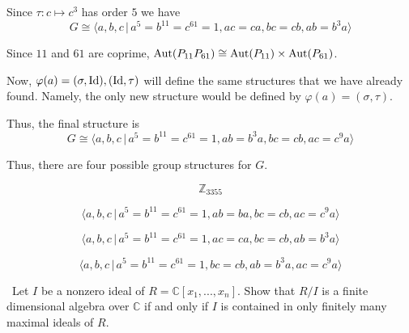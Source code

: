 \documentclass[12pt]{AlgebraQual}
\begin{document}
\begin{solution}
Since $\tau:c\mapsto c^3$ has order $5$ we have $$G\cong\langle a,b,c\,|\, a^5=b^{11}=c^{61}=1,ac=ca,bc=cb,ab=b^3a\rangle$$

 Since $11$ and $61$ are coprime, $\text{Aut}(P_{11}P_{61})\cong\text{Aut}(P_{11})\times\text{Aut}(P_{61})$.

Now, $\varphi(a)=(\sigma,\text{Id}),(\text{Id},\tau)$ will define the same structures that we have already found. Namely, the only new structure would be defined by $\varphi(a)=(\sigma,\tau)$.

Thus, the final structure is $$G\cong\langle a,b,c\,|\, a^5=b^{11}=c^{61}=1,ab=b^3a,bc=cb,ac=c^9a\rangle$$

Thus, there are four possible group structures for $G.$

\begin{center}
    \begin{framed}
    $$\mathbb{Z}_{3355}$$

    $$\langle a,b,c\,|\, a^5=b^{11}=c^{61}=1,ab=ba,bc=cb,ac=c^9a\rangle$$

    $$\langle a,b,c\,|\, a^5=b^{11}=c^{61}=1,ac=ca,bc=cb,ab=b^3a\rangle$$

    $$\langle a,b,c\,|\, a^5=b^{11}=c^{61}=1,bc=cb,ab=b^3a,ac=c^9a\rangle$$
    \end{framed}
\end{center}
\end{solution}
\newpage



\begin{problem} $\,$
Let $I$ be a nonzero ideal of $R=\mathbb{C}[x_1,...,x_n]$. Show that $R/I$ is a finite dimensional algebra over $\mathbb{C}$ if and only if $I$ is contained in only finitely many maximal ideals of $R.$
\end{problem}
\end{document}
